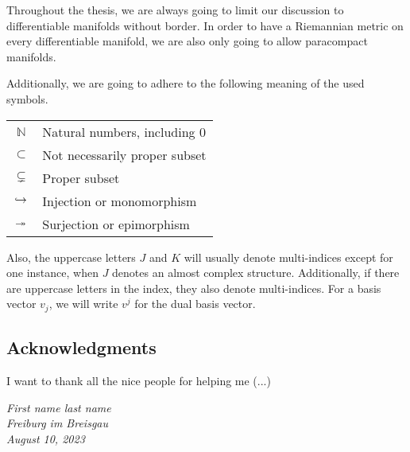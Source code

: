 Throughout the thesis, we are always going to limit our discussion to differentiable manifolds
without border. In order to have a Riemannian metric on every differentiable manifold, we are also
only going to allow paracompact manifolds. 

Additionally, we are going to adhere to the following meaning of the used symbols.

\begin{table}[ht]
	\centering
	\begin{tabular}{cp{}}
		$\mathbb{N}$ & Natural numbers, including 0\\
		$\subset$ & Not necessarily proper subset \\
		$\subsetneq$ & Proper subset\\
		$\hookrightarrow$ & Injection or monomorphism\\
		$\twoheadrightarrow$ & Surjection or epimorphism\\
	\end{tabular}
\end{table}

Also, the uppercase letters $J$ and $K$ will usually denote multi-indices except for one instance,
when $J$ denotes an almost complex structure. Additionally, if there are uppercase letters in the
index, they also denote multi-indices. For a basis vector $v_j$, we will write $v^j$ for the dual
basis vector.

\subsection*{Acknowledgments}\;

I want to thank all the nice people for helping me (...)
\vspace*{1.3cm}
\begin{flushright}
	\emph{First name last name}\\
	\emph{Freiburg im Breisgau}\\
	\emph{August 10, 2023}
\end{flushright}

\starttocentries   %




